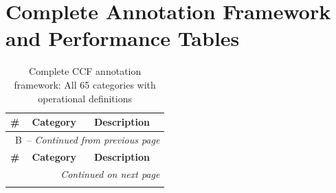 \section{Complete Annotation Framework and Performance Tables}
\label{sec:appendix_tables}
\setcounter{table}{0}  %
\renewcommand{\thetable}{B\arabic{table}}  %
\renewcommand\theHtable{AppendixB.\thetable}  %
{\footnotesize
{}
\begin{longtable}{p{0.5cm}p{5cm}p{16cm}}
\caption{Complete CCF annotation framework: All 65 categories with operational definitions}
\label{tab:complete_framework}
 \\
\toprule
\textbf{\#} & \textbf{Category} & \textbf{Description} \\
\midrule
\endfirsthead
\multicolumn{3}{c}{\tablename\ \thetable\ -- \textit{Continued from previous page}} \\
\toprule
\textbf{\#} & \textbf{Category} & \textbf{Description} \\
\midrule
\endhead
\midrule
\multicolumn{3}{r}{\textit{Continued on next page}} \\
\endfoot
\bottomrule
\endlastfoot


\end{longtable}}
